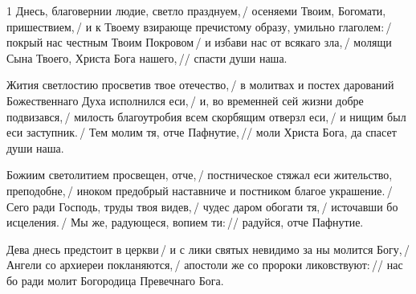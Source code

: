 


\begin{hangparas}{\hpindent}{1}
\large
{}
Днесь, благовернии людие, светло празднуем,\,/ осеняеми
Твоим, Богомати, пришествием,\,/ и к Твоему взирающе
пречистому образу, умильно глаголем:\,/ покрый нас честным
Твоим Покровом\,/ и избави нас от всякаго зла,\,/ молящи
Сына Твоего, Христа Бога нашего,\,// спасти души наша.


Жития светлостию просветив твое отечество,\,/ в молитвах
и постех дарований Божественнаго Духа исполнился еси,\,/
и, во временней сей жизни добре подвизався,\,/ милость
благоутробия всем скорбящим отверзл еси,\,/ и нищим был еси
заступник.\,/ Тем молим тя, отче Пафнутие,\,// моли Христа
Бога, да спасет души наша.

Божиим светолитием просвещен, отче,\,/ постническое стяжал
еси жительство, преподобне,\,/ иноком предобрый наставниче
и постником благое украшение.\,/ Сего ради Господь, труды
твоя видев,\,/ чудес даром обогати тя,\,/ источавши бо
исцеления.\,/ Мы же, радующеся, вопием ти:\,// радуйся, отче
Пафнутие.

Дева днесь предстоит в церкви\,/ и с лики святых невидимо
за ны молится Богу,\,/ Ангели со архиереи покланяются,\,/
апостоли же со пророки ликовствуют:\,// нас бо ради молит
Богородица Превечнаго Бога.

\end{hangparas}

